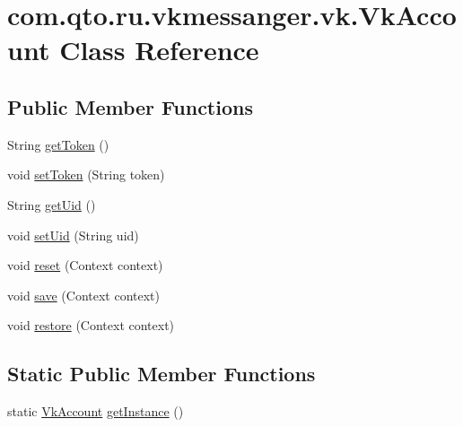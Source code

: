 \hypertarget{classcom_1_1qto_1_1ru_1_1vkmessanger_1_1vk_1_1_vk_account}{}\section{com.\+qto.\+ru.\+vkmessanger.\+vk.\+Vk\+Account Class Reference}
\label{classcom_1_1qto_1_1ru_1_1vkmessanger_1_1vk_1_1_vk_account}
\subsection*{Public Member Functions}
\begin{DoxyCompactItemize}
\item 
String \hyperlink{classcom_1_1qto_1_1ru_1_1vkmessanger_1_1vk_1_1_vk_account_ab12173810fd76f7834ef92944ea47136}{get\+Token} ()
\item 
void \hyperlink{classcom_1_1qto_1_1ru_1_1vkmessanger_1_1vk_1_1_vk_account_ab2eb3318cfb64ed077c57b0d5a198887}{set\+Token} (String token)
\item 
String \hyperlink{classcom_1_1qto_1_1ru_1_1vkmessanger_1_1vk_1_1_vk_account_ada761a4b99ed534245c815173e9018c1}{get\+Uid} ()
\item 
void \hyperlink{classcom_1_1qto_1_1ru_1_1vkmessanger_1_1vk_1_1_vk_account_aed94a8319c0ef4c54ad034ba347d5de0}{set\+Uid} (String uid)
\item 
void \hyperlink{classcom_1_1qto_1_1ru_1_1vkmessanger_1_1vk_1_1_vk_account_ae46e819fbead0c20ad4f87822b30c488}{reset} (Context context)
\item 
void \hyperlink{classcom_1_1qto_1_1ru_1_1vkmessanger_1_1vk_1_1_vk_account_a3cf8c558c13b44e6579f714102500ee2}{save} (Context context)
\item 
void \hyperlink{classcom_1_1qto_1_1ru_1_1vkmessanger_1_1vk_1_1_vk_account_adb167de89fe355b44860b71948d0d5e6}{restore} (Context context)
\end{DoxyCompactItemize}
\subsection*{Static Public Member Functions}
\begin{DoxyCompactItemize}
\item 
static \hyperlink{classcom_1_1qto_1_1ru_1_1vkmessanger_1_1vk_1_1_vk_account}{Vk\+Account} \hyperlink{classcom_1_1qto_1_1ru_1_1vkmessanger_1_1vk_1_1_vk_account_aff295ecb029c042b896641f12cd86e2f}{get\+Instance} ()
\end{DoxyCompactItemize}


